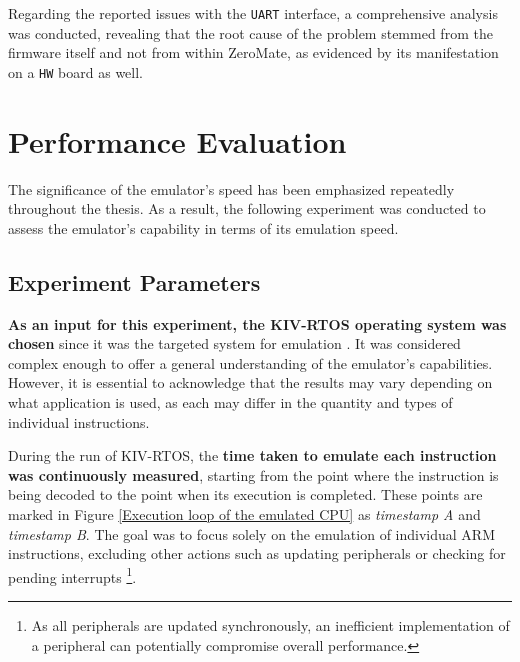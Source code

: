 \documentclass[english, ing, kiv, he, iso690numb, pdf]{fasthesis}
\begin{document}
	\textit{}
	
	\begin{important}
		Regarding the reported issues with the \texttt{UART} interface, a comprehensive analysis was conducted, revealing that the root cause of the problem stemmed from the firmware itself and not from within ZeroMate, as evidenced by its manifestation on a \texttt{HW} board as well.
	\end{important}
	
	\chapter{Performance Evaluation} \label{chapter-Performance-Evaluation}
	
	The significance of the emulator's speed has been emphasized repeatedly throughout the thesis. As a result, the following experiment was conducted to assess the emulator's capability in terms of its emulation speed.
	
	\section{Experiment Parameters}
	
	\textbf{As an input for this experiment, the KIV-RTOS operating system was chosen} since it was the targeted system for emulation \cite{KIV-RTOS}. It was considered complex enough to offer a general understanding of the emulator's capabilities.  However, it is essential to acknowledge that the results may vary depending on what application is used, as each may differ in the quantity and types of individual instructions.
	
	During the run of KIV-RTOS, the \textbf{time taken to emulate each instruction was continuously measured}, starting from the point where the instruction is being decoded to the point when its execution is completed. These points are marked in Figure \ref{Execution loop of the emulated CPU} as \textit{timestamp A} and \textit{timestamp B}. The goal was to focus solely on the emulation of individual ARM instructions, excluding other actions such as updating peripherals or checking for pending interrupts \footnote{As all peripherals are updated synchronously, an inefficient implementation of a peripheral can potentially compromise overall performance.}.
	
\end{document}
